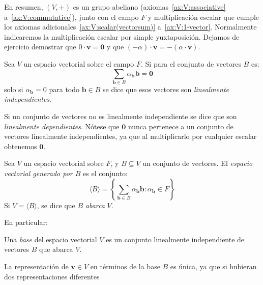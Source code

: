   \noindent
  En resumen,
  \((V, +)\) es un grupo abeliano%
  (axiomas~\ref{ax:V:associative} a~\ref{ax:V:commutative}),
  junto con el campo \(F\) y multiplicación escalar que cumple
  los axiomas adicionales~\ref{ax:V:scalar(vectorsum)}
  a~\ref{ax:V:1-vector}.
  Normalmente indicaremos la multiplicación escalar
  por simple yuxtaposición.
  Dejamos de ejercicio
  demostrar que \(0 \cdot \boldsymbol{v} = \boldsymbol{0}\)
  y que \((- \alpha) \cdot \boldsymbol{v}
	    = - ( \alpha \cdot \boldsymbol{v})\).
  \begin{definition}
    Sea \(V\) un espacio vectorial sobre el campo \(F\).
    Si para el conjunto de vectores \(B\)
    es:
    \begin{equation*}
      \sum_{\boldsymbol{b} \in B}
	\alpha_{\boldsymbol{b}} \boldsymbol{b}
	= \boldsymbol{0}
    \end{equation*}
    solo si \(\alpha_{\boldsymbol{b}} = 0\)
    para todo \(\boldsymbol{b} \in B\)
    se dice que esos vectores
    son \emph{linealmente independientes}.%
  \end{definition}
  Si un conjunto de vectores no es linealmente independiente
  se dice que son \emph{linealmente dependientes}.
  Nótese que \(\boldsymbol{0}\)
  nunca pertenece
  a un conjunto de vectores linealmente independientes,
  ya que al multiplicarlo
  por cualquier escalar obtenemos \(\boldsymbol{0}\).
  \begin{definition}
    Sea \(V\) un espacio vectorial sobre \(F\),
    y \(B \subseteq V\) un conjunto de vectores.
    El \emph{espacio vectorial generado por \(B\)}
    es el conjunto:
    \begin{equation*}
      \langle B \rangle
	= \left\{
	    \sum_{\boldsymbol{b} \in B}
	      \alpha_{\boldsymbol{b}} \boldsymbol{b}
	       \colon \alpha_{\boldsymbol{b}} \in F
	  \right\}
    \end{equation*}
    Si \(V = \langle B \rangle\),
    se dice que \(B\) \emph{abarca} \(V\).
  \end{definition}
  En particular:
  \begin{definition}
    Una \emph{base} del espacio vectorial \(V\)
    es un conjunto linealmente independiente de vectores \(B\)
    que abarca \(V\).
  \end{definition}
  La representación de \(\boldsymbol{v} \in V\)
  en términos de la base \(B\)
  es única,
  ya que si hubieran dos representaciones diferentes
